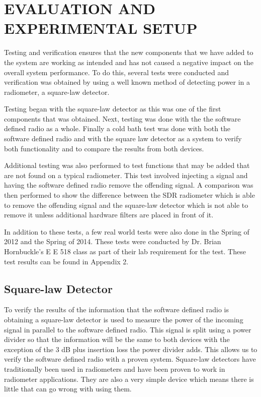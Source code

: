 

\chapter{EVALUATION AND EXPERIMENTAL SETUP}
Testing and verification ensures that the new components that we have added to the system are working as intended and has not caused a negative impact on the overall system performance.  To do this, several tests were conducted and verification was obtained by using a well known method of detecting power in a radiometer, a square-law detector.  

Testing began with the square-law detector as this was one of the first components that was obtained.  Next, testing was done with the the software defined radio as a whole.  Finally a cold bath test was done with both the software defined radio and with the square law detector as a system to verify both functionality and to compare the results from both devices.  

Additional testing was also performed to test functions that may be added that are not found on a typical radiometer.  This test involved injecting a signal and having the software defined radio remove the offending signal.  A comparison was then performed to show the difference between the SDR radiometer which is able to remove the offending signal and the square-law detector which is not able to remove it unless additional hardware filters are placed in front of it.

In addition to these tests, a few real world tests were also done in the Spring of 2012 and the Spring of 2014.  These tests were conducted by Dr. Brian Hornbuckle's E E 518 class as part of their lab requirement for the test.  These test results can be found in Appendix 2.

\section{Square-law Detector}
To verify the results of the information that the software defined radio is obtaining a square-law detector is used to measure the power of the incoming signal in parallel to the software defined radio.  This signal is split using a power divider so that the information will be the same to both devices with the exception of the 3 dB plus insertion loss the power divider adds.  This allows us to verify the software defined radio with a proven system.  Square-law detectors have traditionally been used in radiometers and have been proven to work in radiometer applications.  They are also a very simple device which means there is little that can go wrong with using them.

